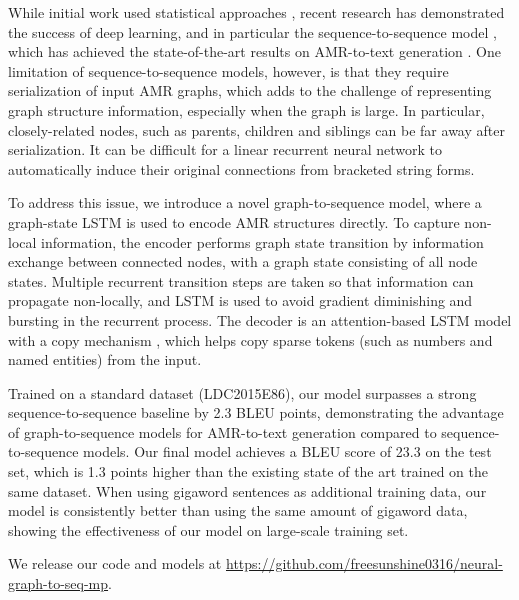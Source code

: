 \documentclass[11pt,a4paper]{article}
\begin{document}
While initial work used statistical approaches \cite{jeff2016amrgen,pourdamghani-knight-hermjakob:2016:INLG,song-EtAl:2017:Short,lampouras-vlachos:2017:SemEval,mille-EtAl:2017:SemEval,gruzitis-gosko-barzdins:2017:SemEval}, recent research has demonstrated the success of deep learning, and in particular the sequence-to-sequence model \cite{sutskever2014sequence}, which has achieved the state-of-the-art results on AMR-to-text generation \cite{konstas-EtAl:2017:Long}. 
One limitation of sequence-to-sequence models,
however, is that they require serialization of input AMR graphs, which adds to the challenge of representing graph structure information, especially when the graph is large.
In particular, closely-related nodes, such as parents, children and siblings can be far away after serialization.
It can be difficult for a linear recurrent neural network to automatically induce their original connections from bracketed string forms.


To address this issue, we introduce a novel graph-to-sequence model, where a graph-state LSTM is used to encode AMR structures directly.
To capture non-local information, the encoder performs graph state transition by information exchange between connected nodes, with a graph state consisting of all node states.
Multiple recurrent transition steps are taken so that information can propagate non-locally, and LSTM \cite{hochreiter1997long} is used to avoid gradient diminishing and bursting in the recurrent process.
The decoder is an attention-based LSTM model with a 
copy mechanism \cite{gu-EtAl:2016:P16-1,gulcehre-EtAl:2016:P16-1}, which helps copy sparse tokens (such as numbers and named entities) from the input. 


Trained on a standard dataset (LDC2015E86), our model surpasses a strong sequence-to-sequence baseline by 2.3 BLEU points, demonstrating the advantage of graph-to-sequence models for AMR-to-text generation compared to sequence-to-sequence models.
Our final model achieves a BLEU score of 23.3 on the test set, which is 1.3 points higher than the  existing state of the art \cite{konstas-EtAl:2017:Long} trained on the same dataset.
When using gigaword sentences as additional training data, our model is consistently better than  using the same amount of gigaword data, showing the effectiveness of our model on large-scale training set.


We release our code and models at \url{https://github.com/freesunshine0316/neural-graph-to-seq-mp}.
\end{document}
